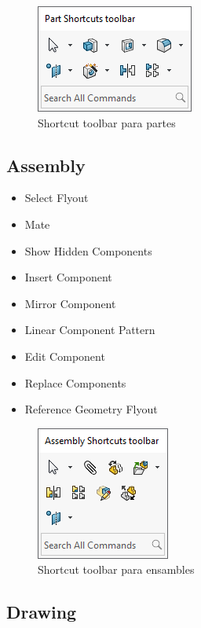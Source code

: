 \documentclass[12pt,letterpaper,final]{report}
\begin{document}
\begin{figure}[H]
	\centering
	\includegraphics[width=0.45\linewidth, height=0.5\textheight,keepaspectratio]{Imagenes/solidworks_shortcutbars_03}
	\caption{Shortcut toolbar para partes}
	\label{fig:solidworksshortcutbars03}
\end{figure}

\subsection{Assembly}

\begin{itemize}
	\item Select Flyout
	\item Mate
	\item Show Hidden Components
	\item Insert Component
	\item Mirror Component
	\item Linear Component Pattern
	\item Edit Component
	\item Replace Components
	\item Reference Geometry Flyout
\end{itemize}

\begin{figure}[H]
	\centering
	\includegraphics[width=0.35\linewidth, height=0.4\textheight,keepaspectratio]{Imagenes/solidworks_shortcutbars_04}
	\caption{Shortcut toolbar para ensambles}
	\label{fig:solidworksshortcutbars04}
\end{figure}

\subsection{Drawing}
\end{document}
